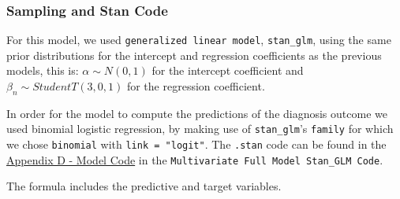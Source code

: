 \documentclass[
]{article}
\begin{document}
\hypertarget{sampling-and-stan-code}{%
\subsubsection{Sampling and Stan Code}\label{sampling-and-stan-code}}

For this model, we used \texttt{generalized\ linear\ model},
\texttt{stan\_glm}, using the same prior distributions for the intercept
and regression coefficients as the previous models, this is:
\(\alpha \sim N(0,1)\) for the intercept coefficient and
\(\beta_n \sim StudentT(3,0,1)\) for the regression coefficient.

In order for the model to compute the predictions of the diagnosis
outcome we used binomial logistic regression, by making use of
\texttt{stan\_glm}'s \texttt{family} for which we chose
\texttt{binomial} with \texttt{link\ =\ "logit"}. The \texttt{.stan}
code can be found in the \protect\hyperlink{apb}{Appendix D - Model
Code} in the \texttt{Multivariate\ Full\ Model\ Stan\_GLM\ Code}.

The formula includes the predictive and target variables.
\end{document}
